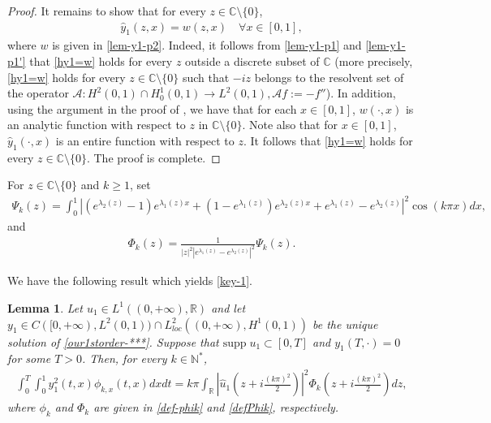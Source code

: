 \documentclass[11pt, reqno]{amsart}
\theoremstyle{plain}
\newtheorem{lemma}[thm]{Lemma}
\numberwithin{equation}{section}
\newcommand{\mC}{\mathbb{C}}
\newcommand{\mN}{\mathbb{N}}
\newcommand{\hy}{\hat y}
\newcommand{\hu}{\hat u}
\begin{document}
\begin{proof}
It remains to show that for every $z \in \mC \setminus \{0\}$,
\begin{align}	\label{hy1=w}
	\hy_1(z, x) = w(z, x) \quad \forall x \in [0, 1],
\end{align}
where $w$ is given in \eqref{lem-y1-p2}. Indeed, it follows from \eqref{lem-y1-p1} and \eqref{lem-y1-p1'} that \eqref{hy1=w} holds for every $z$ outside a discrete subset of $\mC$ (more precisely, \eqref{hy1=w} holds for every $z \in \mC \setminus \{0\}$ such that $-iz$ belongs to the resolvent set of the operator $\mathcal{A}: H^2(0, 1) \cap H^1_0(0, 1) \to L^2(0, 1), \mathcal{A}f := - f''$).  In addition, using the argument in the proof of \cite[Lemma A.1]{Coron-Koenig-Nguyen}, we have that for each $x \in [0, 1]$, $w(\cdot, x)$ is an analytic function with respect to $z$ in $\mC \setminus \{0\}$. Note also that for $x \in [0, 1]$, $\hat y_1(\cdot, x)$ is an entire function with respect to $z$. It follows that \eqref{hy1=w} holds for every $z \in \mC \setminus \{0\}$. The proof is complete. 
\end{proof}


For $z \in \mC \setminus \{0\}$ and $k \ge 1$, set 
\begin{align} \label{def-J}
\Psi_k(z) = \int_0^1 \left| \left(e^{\lambda_2(z)} - 1 \right) e^{\lambda_1(z) x} + \left(1 - e^{\lambda_1(z)} \right) e^{\lambda_2(z) x} + e^{\lambda_1(z)} - e^{\lambda_2(z)} \right|^2 \cos(k \pi x) dx,
\end{align}
and
\begin{align}
\label{defPhik}
        \Phi_k(z)
        = \frac{1}{
        |z|^2 |e^{\lambda_1(z)} - e^{\lambda_2(z)}|^2} \Psi_k(z). 
\end{align}

We have the following result which yields \eqref{key-1}.  

\begin{lemma}   \label{lem-key-1}
Let $u_1 \in L^1((0, +\infty), \mathbb{R})$ and let $y_1 \in C([0, +\infty), L^2(0, 1)) \cap L^2_{loc}((0, +\infty), H^1(0, 1))$ be the unique solution of \eqref{our1storder-***}. Suppose that $\mathrm{supp} \; u_1 \subset [0, T]$ and $y_1(T, \cdot) = 0$ for some $T>0$. Then, for every $k \in \mN^*$,    
\begin{align}   \label{projy2}  
       \int_0^T \int_0^1 y_1^2(t, x) \phi_{k, x}(t, x) dx  dt = k \pi \int_{\mathbb{R}} \left| \hu_1\left(z + i \frac{(k \pi)^2}{2} \right) \right|^2 \Phi_k \left(z + i\frac{(k \pi)^2}{2} \right) dz,
  \end{align}
  where $\phi_k$ and $\Phi_k$ are given in \eqref{def-phik} and \eqref{defPhik}, respectively. 
\end{lemma}
\end{document}
